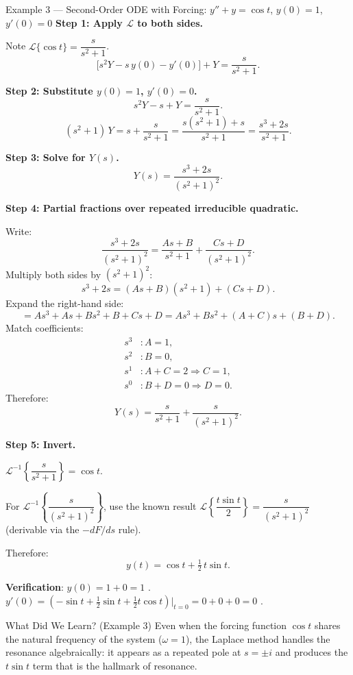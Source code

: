 \documentclass[12pt,a4paper]{article}
\begin{document}
\begin{infobox}{Example 3 --- Second-Order ODE with Forcing: $y'' + y = \cos t$, $y(0)=1$, $y'(0)=0$}
\textbf{Step 1: Apply $\mathcal{L}$ to both sides.}

Note $\mathcal{L}\{\cos t\} = \dfrac{s}{s^2+1}$.
\[
  \bigl[s^2 Y - s\,y(0) - y'(0)\bigr] + Y = \frac{s}{s^2+1}.
\]

\textbf{Step 2: Substitute $y(0)=1$, $y'(0)=0$.}
\[
  s^2 Y - s + Y = \frac{s}{s^2+1}.
\]
\[
  (s^2+1)\,Y = s + \frac{s}{s^2+1} = \frac{s(s^2+1)+s}{s^2+1}
             = \frac{s^3 + 2s}{s^2+1}.
\]

\textbf{Step 3: Solve for $Y(s)$.}
\[
  Y(s) = \frac{s^3 + 2s}{(s^2+1)^2}.
\]

\textbf{Step 4: Partial fractions over repeated irreducible quadratic.}

Write:
\[
  \frac{s^3+2s}{(s^2+1)^2}
  = \frac{As+B}{s^2+1} + \frac{Cs+D}{(s^2+1)^2}.
\]
Multiply both sides by $(s^2+1)^2$:
\[
  s^3+2s = (As+B)(s^2+1) + (Cs+D).
\]
Expand the right-hand side:
\[
  = As^3 + As + Bs^2 + B + Cs + D
  = As^3 + Bs^2 + (A+C)s + (B+D).
\]
Match coefficients:
\begin{align*}
  s^3 &: A = 1, \\
  s^2 &: B = 0, \\
  s^1 &: A + C = 2 \Rightarrow C = 1, \\
  s^0 &: B + D = 0 \Rightarrow D = 0.
\end{align*}
Therefore:
\[
  Y(s) = \frac{s}{s^2+1} + \frac{s}{(s^2+1)^2}.
\]

\textbf{Step 5: Invert.}

$\mathcal{L}^{-1}\!\left\{\dfrac{s}{s^2+1}\right\} = \cos t$.

For $\mathcal{L}^{-1}\!\left\{\dfrac{s}{(s^2+1)^2}\right\}$, use the
known result $\mathcal{L}\!\left\{\dfrac{t\sin t}{2}\right\} =
\dfrac{s}{(s^2+1)^2}$ (derivable via the $-dF/ds$ rule).

Therefore:
\[
  y(t) = \cos t + \tfrac{1}{2}\,t\sin t.
\]

\textbf{Verification}: $y(0) = 1+0 = 1$ \checkmark.
$y'(0) = (-\sin t + \tfrac{1}{2}\sin t + \tfrac{1}{2}t\cos t)\big|_{t=0}
= 0+0+0 = 0$ \checkmark.
\end{infobox}

\begin{learnbox}{What Did We Learn? (Example 3)}
Even when the forcing function $\cos t$ shares the natural frequency of
the system ($\omega = 1$), the Laplace method handles the resonance
algebraically: it appears as a repeated pole at $s = \pm i$ and produces
the $t\sin t$ term that is the hallmark of resonance.
\end{learnbox}
\end{document}
